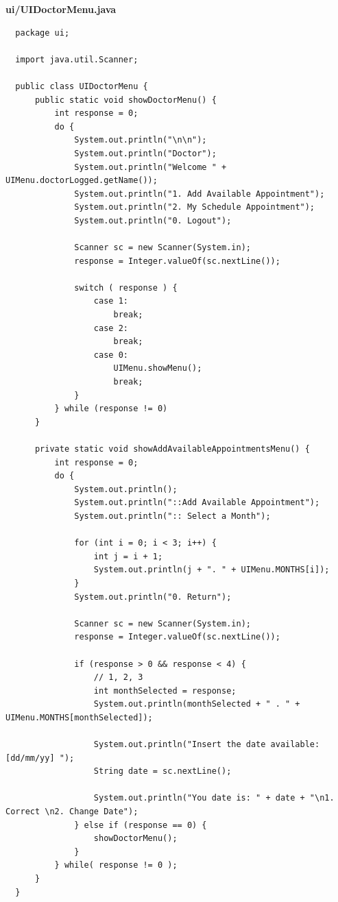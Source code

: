 \documentclass{article}
\begin{document}
\textbf{ui/UIDoctorMenu.java}
\begin{verbatim}
  package ui;

  import java.util.Scanner;

  public class UIDoctorMenu {
      public static void showDoctorMenu() {
          int response = 0;
          do {
              System.out.println("\n\n");
              System.out.println("Doctor");
              System.out.println("Welcome " + UIMenu.doctorLogged.getName());
              System.out.println("1. Add Available Appointment");
              System.out.println("2. My Schedule Appointment");
              System.out.println("0. Logout");

              Scanner sc = new Scanner(System.in);
              response = Integer.valueOf(sc.nextLine());

              switch ( response ) {
                  case 1:
                      break;
                  case 2:
                      break;
                  case 0:
                      UIMenu.showMenu();
                      break;
              }
          } while (response != 0)
      }

      private static void showAddAvailableAppointmentsMenu() {
          int response = 0;
          do {
              System.out.println();
              System.out.println("::Add Available Appointment");
              System.out.println(":: Select a Month");

              for (int i = 0; i < 3; i++) {
                  int j = i + 1;
                  System.out.println(j + ". " + UIMenu.MONTHS[i]);
              }
              System.out.println("0. Return");

              Scanner sc = new Scanner(System.in);
              response = Integer.valueOf(sc.nextLine());

              if (response > 0 && response < 4) {
                  // 1, 2, 3
                  int monthSelected = response;
                  System.out.println(monthSelected + " . " + UIMenu.MONTHS[monthSelected]);

                  System.out.println("Insert the date available: [dd/mm/yy] ");
                  String date = sc.nextLine();

                  System.out.println("You date is: " + date + "\n1. Correct \n2. Change Date");
              } else if (response == 0) {
                  showDoctorMenu();
              }
          } while( response != 0 );
      }
  }
\end{verbatim}
\end{document}
